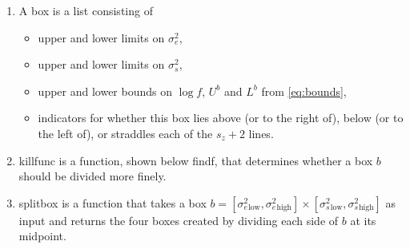 \documentclass{report}
\newcommand{\textcompute}{\textsf}
\newcommand{\RL}{f}
\newcommand{\logRL}{\log\RL}
\newcommand{\sigssq}{\sigma_s^2}
\newcommand{\sigesq}{\sigma_e^2}
\newcommand{\sshat}{\hat\sigma^2_e,\hat\sigma^2_s}
\newcommand{\maxit}{\textcompute{maxit}}
\begin{document}
\begin{enumerate}
\item A \textcompute{box} is a list consisting of
	 \begin{itemize}
	 \item upper and lower limits on $\sigesq$,
	 \item upper and lower limits on $\sigssq$,
	 \item upper and lower bounds on $\logRL$, $U^b$ and $L^b$ from \eqref{eq:bounds},
	 \item indicators for whether this box lies above (or to the right of), below (or to the left of),
	   or straddles each of the $s_z+2$ lines.
	 \end{itemize}
\item \textcompute{killfunc} is a function, shown below \textcompute{findf}, that determines whether
	a box $b$ should be divided more finely.
\item \textcompute{splitbox} is a function that takes a box $b =
	[\sigesq{}_\text{low}, \sigesq{}_\text{high}] \times [\sigssq{}_\text{low}, \sigssq{}_\text{high}]$ as input 
	and returns the four boxes created by dividing each side of $b$ at its midpoint.
\end{enumerate}
\end{document}
